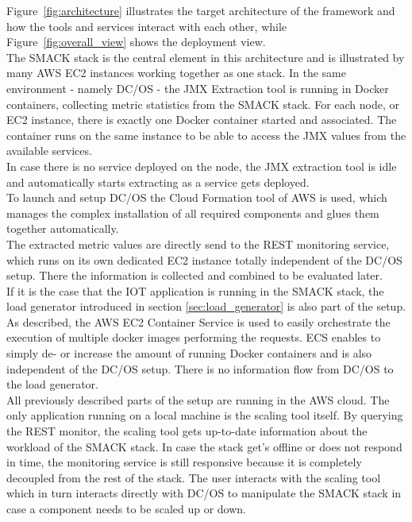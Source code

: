 Figure~\ref{fig:architecture} illustrates the target architecture of the framework and how the tools and services interact with each other, while Figure~\ref{fig:overall_view} shows the deployment view.\\
The SMACK stack is the central element in this architecture and is illustrated by many AWS EC2 instances working together as one stack.
In the same environment - namely DC/OS - the JMX Extraction tool is running in Docker containers, collecting metric statistics from the SMACK stack.
For each node, or EC2 instance, there is exactly one Docker container started and associated.
The container runs on the same instance to be able to access the JMX values from the available services.\\

In case there is no service deployed on the node, the JMX extraction tool is idle and automatically starts extracting as a service gets deployed.\\
To launch and setup DC/OS the Cloud Formation tool of AWS is used, which manages the complex installation of all required components and glues them together automatically.\\
The extracted metric values are directly send to the REST monitoring service, which runs on its own dedicated EC2 instance totally independent of the DC/OS setup.
There the information is collected and combined to be evaluated later.\\

If it is the case that the IOT application is running in the SMACK stack, the load generator introduced in section \ref{sec:load_generator} is also part of the setup.
As described, the AWS EC2 Container Service is used to easily orchestrate the execution of multiple docker images performing the requests.
ECS enables to simply de- or increase the amount of running Docker containers and is also independent of the DC/OS setup.
There is no information flow from DC/OS to the load generator.\\

All previously described parts of the setup are running in the AWS cloud.
The only application running on a local machine is the scaling tool itself.
By querying the REST monitor, the scaling tool gets up-to-date information about the workload of the SMACK stack.
In case the stack get's offline or does not respond in time, the monitoring service is still responsive because it is completely decoupled from the rest of the stack.
The user interacts with the scaling tool which in turn interacts directly with DC/OS to manipulate the SMACK stack in case a component needs to be scaled up or down.

